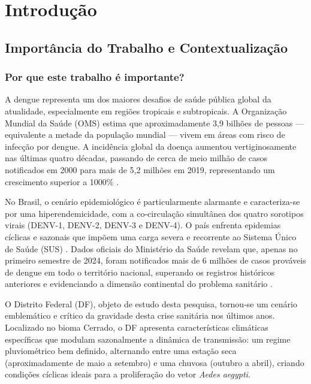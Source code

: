 \chapter[Introdução]{Introdução}
\label{cap:introducao}

\section{Importância do Trabalho e Contextualização}

\subsection{Por que este trabalho é importante?}

A dengue representa um dos maiores desafios de saúde pública global da atualidade, especialmente em regiões tropicais e subtropicais. A Organização Mundial da Saúde (OMS) estima que aproximadamente 3,9 bilhões de pessoas — equivalente a metade da população mundial — vivem em áreas com risco de infecção por dengue. A incidência global da doença aumentou vertiginosamente nas últimas quatro décadas, passando de cerca de meio milhão de casos notificados em 2000 para mais de 5,2 milhões em 2019, representando um crescimento superior a 1000\% \cite{naish2014climate}.

No Brasil, o cenário epidemiológico é particularmente alarmante e caracteriza-se por uma hiperendemicidade, com a co-circulação simultânea dos quatro sorotipos virais (DENV-1, DENV-2, DENV-3 e DENV-4). O país enfrenta epidemias cíclicas e sazonais que impõem uma carga severa e recorrente ao Sistema Único de Saúde (SUS) \cite{mussumeci2020large, roster2022machine}. Dados oficiais do Ministério da Saúde revelam que, apenas no primeiro semestre de 2024, foram notificados mais de 6 milhões de casos prováveis de dengue em todo o território nacional, superando os registros históricos anteriores e evidenciando a dimensão continental do problema sanitário \cite{sinan2025}.

O Distrito Federal (DF), objeto de estudo desta pesquisa, tornou-se um cenário emblemático e crítico da gravidade desta crise sanitária nos últimos anos. Localizado no bioma Cerrado, o DF apresenta características climáticas específicas que modulam sazonalmente a dinâmica de transmissão: um regime pluviométrico bem definido, alternando entre uma estação seca (aproximadamente de maio a setembro) e uma chuvosa (outubro a abril), criando condições cíclicas ideais para a proliferação do vetor \textit{Aedes aegypti}.

